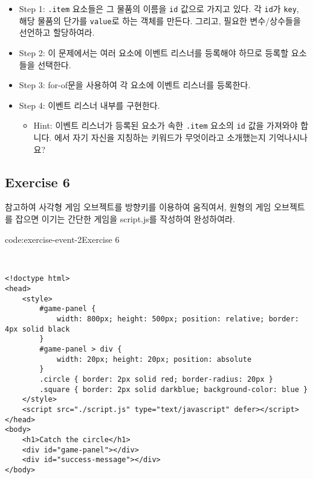 \begin{itemize}
    \item Step 1: \texttt{.item} 요소들은 그 물품의 이름을 \texttt{id} 값으로 가지고 있다. 각 \texttt{id}가 \texttt{key}, 해당 물품의 단가를 \texttt{value}로 하는 객체를 만든다. 그리고, 필요한 변수/상수들을 선언하고 할당하여라.
    \item Step 2: 이 문제에서는 여러 요소에 이벤트 리스너를 등록해야 하므로 등록할 요소들을 선택한다.
    \item Step 3: for-of문을 사용하여 각 요소에 이벤트 리스너를 등록한다.
    \item Step 4: 이벤트 리스너 내부를 구현한다.
    \begin{itemize}
        \item Hint: 이벤트 리스너가 등록된 요소가 속한 \texttt{.item} 요소의 \texttt{id} 값을 가져와야 합니다. 에서 자기 자신을 지칭하는 키워드가 무엇이라고 소개했는지 기억나시나요?
    \end{itemize}
\end{itemize}

\subsection*{Exercise 6}

\를 참고하여 사각형 게임 오브젝트를 방향키를 이용하여 움직여서, 원형의 게임 오브젝트를 잡으면 이기는 간단한 게임을 script.js를 작성하여 완성하여라.

\begin{codeenv}{code:exercise-event-2}{Exercise 6}\begin{verbatim}


<!doctype html>
<head>
    <style>
        #game-panel {
            width: 800px; height: 500px; position: relative; border: 4px solid black
        }
        #game-panel > div {
            width: 20px; height: 20px; position: absolute
        }
        .circle { border: 2px solid red; border-radius: 20px }
        .square { border: 2px solid darkblue; background-color: blue }
    </style>
    <script src="./script.js" type="text/javascript" defer></script>
</head>
<body>
    <h1>Catch the circle</h1>
    <div id="game-panel"></div>
    <div id="success-message"></div>
</body>
\end{verbatim}
\end{codeenv}

